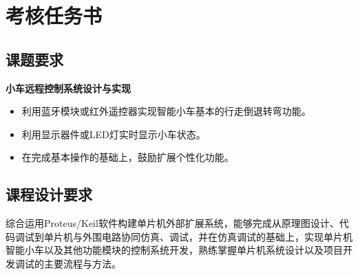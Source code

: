 \section{考核任务书}
\subsection{课题要求}
\textbf{小车远程控制系统设计与实现}
\begin{itemize}
    \item 利用蓝牙模块或红外遥控器实现智能小车基本的行走倒退转弯功能。
    \item 利用显示器件或LED灯实时显示小车状态。
    \item 在完成基本操作的基础上，鼓励扩展个性化功能。
\end{itemize}
\subsection{课程设计要求}
综合运用Proteus/Keil软件构建单片机外部扩展系统，能够完成从原理图设计、代码调试到单片机与外围电路协同仿真、调试，并在仿真调试的基础上，实现单片机智能小车以及其他功能模块的控制系统开发，熟练掌握单片机系统设计以及项目开发调试的主要流程与方法。



